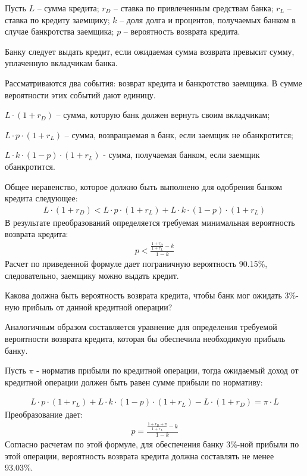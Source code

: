 \documentclass[12pt, table]{exam}
\begin{document}
\begin{questions}
\begin{subparts}
\begin{solution}[6em]
	Пусть $L$ – сумма кредита; $r_D$ – ставка по привлеченным средствам банка;  $r_L$ – ставка по кредиту заемщику; $k$ – доля долга и процентов, получаемых банком в случае банкротства заемщика; $p$ – вероятность возврата кредита.
	
	Банку следует выдать кредит, если ожидаемая сумма возврата превысит сумму, уплаченную вкладчикам банка.
	
	Рассматриваются два события: возврат кредита и банкротство заемщика. В сумме вероятности этих событий дают единицу. 
	
	$L\cdot (1+r_D )$ – сумма, которую банк должен вернуть своим вкладчикам;
	
	$L \cdot p \cdot (1+r_L )$ – сумма, возвращаемая в банк, если заемщик не обанкротится;
	
	$L \cdot k \cdot (1-p) \cdot (1+r_L )$ - сумма, получаемая банком, если заемщик обанкротится.
	
	Общее неравенство, которое должно быть выполнено для одобрения банком кредита следующее:
	\begin{align*}
	L\cdot (1+r_D )<L \cdot p \cdot (1+r_L ) + L \cdot k \cdot (1-p) \cdot (1+r_L )
	\end{align*}
	В результате преобразований определяется требуемая минимальная вероятность возврата кредита:
	\begin{align*}
	p<\frac{\frac{1+r_D}{1+r_L}-k}{1-k}
	\end{align*}	
	Расчет по приведенной формуле дает пограничную вероятность 90.15\%, следовательно, заемщику можно выдать кредит.
\end{solution}

\subpart[10] Какова должна быть вероятность возврата кредита, чтобы банк мог ожидать 3\%-ную прибыль от данной кредитной операции?

\begin{solution}[6em]
	Аналогичным образом составляется уравнение для определения требуемой вероятности возврата кредита, которая бы обеспечила необходимую прибыль банку.
	
	Пусть $\pi$ - норматив прибыли по кредитной операции, тогда ожидаемый доход от кредитной операции должен быть равен сумме прибыли по нормативу:
	
	\begin{align*}
	L \cdot p \cdot (1+r_L ) + L \cdot k \cdot (1-p) \cdot (1+r_L ) - L \cdot (1+r_D ) = \pi \cdot L
	\end{align*}
	Преобразование дает:
	\begin{align*}
	p = \frac{\frac{1+r_D+\pi}{1+r_L} - k}{1 - k}
	\end{align*}
	Согласно расчетам по этой формуле, для обеспечения банку 3\%-ной прибыли по этой операции, вероятность возврата кредита должна составлять не менее 93.03\%.
\end{solution}


\end{subparts}
\end{questions}
\end{document}
